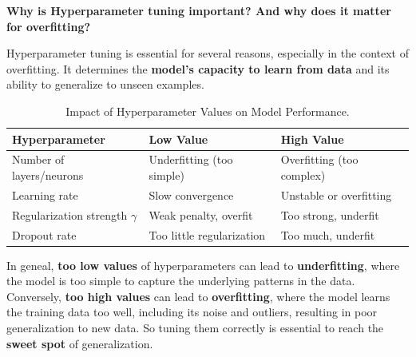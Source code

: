 \highspace
\begin{flushleft}
    \textcolor{Green3}{ \textbf{Why is Hyperparameter tuning important? And why does it matter for overfitting?}}
\end{flushleft}
Hyperparameter tuning is essential for several reasons, especially in the context of overfitting. It determines the \textbf{model's capacity to learn from data} and its ability to generalize to unseen examples.

\begin{table}[!htp]
    \centering
    \begin{tabular}{@{} p{9.7em} l l @{}}
        \toprule
        \textbf{Hyperparameter} & \textbf{Low Value} & \textbf{High Value} \\
        \midrule
        Number of layers/neurons & Underfitting (too simple) & Overfitting (too complex) \\[.3em]
        Learning rate & Slow convergence & Unstable or overfitting \\[.3em]
        Regularization strength $\gamma$ & Weak penalty, overfit & Too strong, underfit \\[.3em]
        Dropout rate & Too little regularization & Too much, underfit \\
        \bottomrule
    \end{tabular}
    \caption{Impact of Hyperparameter Values on Model Performance.}
    \label{tab:hyperparameter-impact}
\end{table}

\noindent
In geneal, \textbf{too low values} of hyperparameters can lead to \textbf{underfitting}, where the model is too simple to capture the underlying patterns in the data. Conversely, \textbf{too high values} can lead to \textbf{overfitting}, where the model learns the training data too well, including its noise and outliers, resulting in poor generalization to new data. So tuning them correctly is essential to reach the \textbf{sweet spot} of generalization.

\newpage

